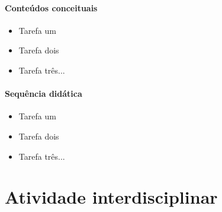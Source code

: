 \paragraph{Conteúdos conceituais}


\begin{itemize}
\item Tarefa um
\item Tarefa dois
\item Tarefa três...
\end{itemize}

\paragraph{Sequência didática}

\begin{itemize}
\item Tarefa um
\item Tarefa dois
\item Tarefa três...
\end{itemize}


\section{Atividade interdisciplinar}


\lipsum[1-6]